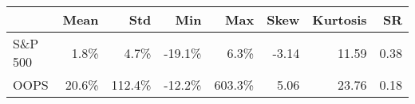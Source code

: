 \begin{tabular}{lrrrrrrr}
\hline
         &   Mean &    Std &    Min &    Max &   Skew &   Kurtosis &   SR \\
\hline
 S\&P 500 &   1.8\% &   4.7\% & -19.1\% &   6.3\% &  -3.14 &      11.59 & 0.38 \\
 OOPS    &  20.6\% & 112.4\% & -12.2\% & 603.3\% &   5.06 &      23.76 & 0.18 \\
\hline
\end{tabular}